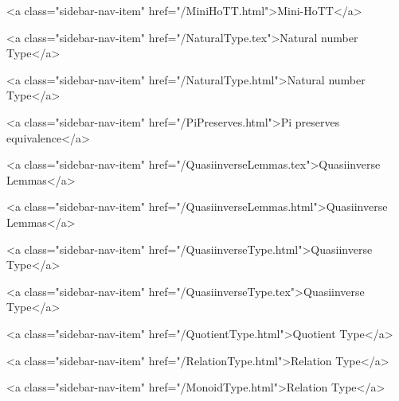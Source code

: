           <a class="sidebar-nav-item" href="/MiniHoTT.html">Mini-HoTT</a>
        
      
    
      
        
          <a class="sidebar-nav-item" href="/NaturalType.tex">Natural number Type</a>
        
      
    
      
        
          <a class="sidebar-nav-item" href="/NaturalType.html">Natural number Type</a>
        
      
    
      
        
          <a class="sidebar-nav-item" href="/PiPreserves.html">Pi preserves equivalence</a>
        
      
    
      
        
          <a class="sidebar-nav-item" href="/QuasiinverseLemmas.tex">Quasiinverse Lemmas</a>
        
      
    
      
        
          <a class="sidebar-nav-item" href="/QuasiinverseLemmas.html">Quasiinverse Lemmas</a>
        
      
    
      
        
          <a class="sidebar-nav-item" href="/QuasiinverseType.html">Quasiinverse Type</a>
        
      
    
      
        
          <a class="sidebar-nav-item" href="/QuasiinverseType.tex">Quasiinverse Type</a>
        
      
    
      
        
          <a class="sidebar-nav-item" href="/QuotientType.html">Quotient Type</a>
        
      
    
      
        
          <a class="sidebar-nav-item" href="/RelationType.html">Relation Type</a>
        
      
    
      
        
          <a class="sidebar-nav-item" href="/MonoidType.html">Relation Type</a>
        
      
    
